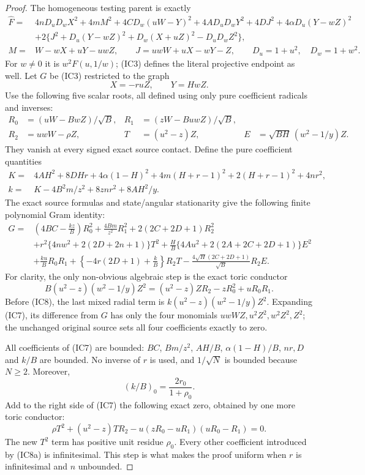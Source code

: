 \begin{proof}
The homogeneous testing parent is exactly
\begin{align*}
 \widehat F={}&4nD_uD_wX^2+4mM^2+4CD_w(uW-Y)^2
     +4AD_uD_wY^2+4DJ^2+4\alpha D_u(Y-wZ)^2\\
 &+2\{J^2+D_u(Y-wZ)^2+D_w(X+uZ)^2-D_uD_wZ^2\},\\
 M={}&W-wX+uY-uwZ,\qquad
 J=uwW+uX-wY-Z,
 \qquad D_u=1+u^2,\quad D_w=1+w^2.
                                                               \tag{IC3}
\end{align*}
For $w\ne0$ it is $w^2F(u,1/w)$; (IC3) defines the literal
projective endpoint as well. Let $G$ be (IC3) restricted to the graph
\[
                         X=-ruZ,\qquad Y=HwZ.
\tag{IC4}
\]
Use the following five scalar roots, all defined using only pure
coefficient radicals and inverses:
\begin{align*}
 R_0&=(uW-BwZ)/\sqrt B,&
 R_1&=(zW-BuwZ)/\sqrt B,\\
 R_2&=uwW-\rho Z,&
 T&=(u^2-z)Z,&
 E&=\sqrt{BH}\,(w^2-1/y)Z.                               \tag{IC5}
\end{align*}
They vanish at every signed exact source contact. Define the pure
coefficient quantities
\begin{align*}
 K={}&4AH^2+8DHr+4\alpha(1-H)^2
      +4m(H+r-1)^2+2(H+r-1)^2+4nr^2,\\
 k={}&K-4B^2m/z^2+8znr^2+8AH^2/y.                      \tag{IC6}
\end{align*}
The exact source formulas and state/angular stationarity give the
following finite polynomial Gram identity:
\begin{align*}
G={}&\left(4BC-\frac{kz}{B}\right)R_0^2
     +\frac{4Bm}{z^2}R_1^2+2(2C+2D+1)R_2^2\\
 &+r^2\{4nw^2+2(2D+2n+1)\}T^2
  +\frac H B\{4Au^2+2(2A+2C+2D+1)\}E^2\\
 &+\frac{ku}{B}R_0R_1
  +\left\{-4r(2D+1)+\frac{k}{B}\right\}R_2T
  -\frac{4\sqrt H(2C+2D+1)}{\sqrt B}R_2E.                   \tag{IC7}
\end{align*}
For clarity, the only non-obvious algebraic step is the exact toric
conductor
\[
 B(u^2-z)(w^2-1/y)Z^2
 =(u^2-z)ZR_2-zR_0^2+uR_0R_1.                         \tag{IC8}
\]
Before (IC8), the last mixed radial term is
$k(u^2-z)(w^2-1/y)Z^2$. Expanding (IC7), its difference from
$G$ has only the four monomials $uwWZ,u^2Z^2,w^2Z^2,Z^2$;
the unchanged original source sets all four coefficients exactly to
zero. 

All coefficients of (IC7) are bounded: $BC$, $Bm/z^2$, $AH/B$,
$\alpha(1-H)/B$, $nr,D$ and $k/B$ are bounded. No inverse of $r$
is used, and $1/\sqrt N$ is bounded because $N\ge2$. Moreover,
\[
 (k/B)_0=\frac{2r_0}{1+\rho_0}.
\]
Add to the right side of (IC7) the following exact zero, obtained
by one more toric conductor:
\[
 \rho T^2+(u^2-z)TR_2
       -u(zR_0-uR_1)(uR_0-R_1)=0.                    \tag{IC8a}
\]
The new $T^2$ term has positive unit residue $\rho_0$. Every other
coefficient introduced by (IC8a) is infinitesimal. This step is what
makes the proof uniform when $r$ is infinitesimal and $n$ unbounded.


\end{proof}
